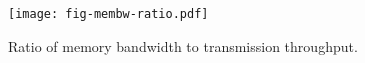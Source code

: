 \begin{figure}[t]
\texttt{[image: fig-membw-ratio.pdf]}
\caption{Ratio of memory bandwidth to transmission throughput.}
\label{fig:membw-ratio}
\end{figure}
